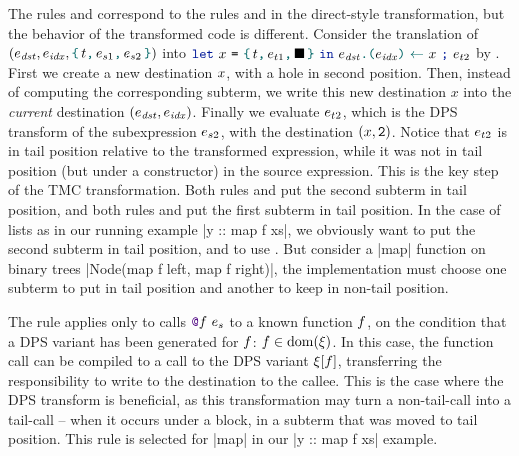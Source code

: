 The rules  and 
correspond to the rules  and  in the direct-style transformation, but the behavior of the transformed code is different. Consider the translation of $
\left(
  \datalangExpr_\mathit{dst},
  \datalangExpr_\mathit{idx},
  \datalangBlock{\datalangTag}{\datalangExpr_{s1}}{\datalangExpr_{s2}}
\right)
$ into $
\datalangLet{\datalangVar}{\datalangBlock{\datalangTag}{\datalangExpr_{t1}}{\datalangHole}}{
  \datalangSeq{\datalangStore{\datalangExpr_\mathit{dst}}{\datalangExpr_\mathit{idx}}{\datalangVar}}{\datalangExpr_{t2}}}
$ by . First we create a new destination $\datalangVar$, with a hole in second position. Then, instead of computing the corresponding subterm, we write this new destination $x$ into the \emph{current} destination $({\datalangExpr_\mathit{dst}}, {\datalangExpr_\mathit{idx}})$. Finally we evaluate $\datalangExpr_{t2}$, which is the DPS transform of the subexpression $\datalangExpr_{s2}$, with the destination $(\datalangVar, \datalangTwo)$. Notice that $\datalangExpr_{t2}$ is in tail position relative to the transformed expression, while it was not in tail position (but under a constructor) in the source expression. This is the key step of the TMC transformation. Both rules  and  put the second subterm in tail position, and both rules  and  put the first subterm in tail position. In the case of lists as in our running example \ocaml|y :: map f xs|, we obviously want to put the second subterm in tail position, and to use . But consider a \ocaml|map| function on binary trees \ocaml|Node(map f left, map f right)|, the implementation must choose one subterm to put in tail position and another to keep in non-tail position.

The rule  applies only to calls $\datalangCall {\datalangFnptr \datalangFn} {\datalangExpr_s}$ to a known function $\datalangFn$, on the condition that a DPS variant has been generated for $\datalangFn$: $\datalangFn \in \dom{\datalangRenaming}$. In this case, the function call can be compiled to a call to the DPS variant $\datalangRenaming [\datalangFn]$, transferring the responsibility to write to the destination to the callee. This is the case where the DPS transform is beneficial, as this transformation may turn a non-tail-call into a tail-call -- when it occurs under a block, in a subterm that was moved to tail position. This rule is selected for \ocaml|map| in our \ocaml|y :: map f xs| example.

